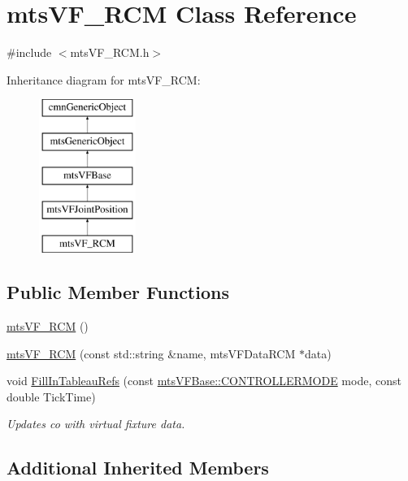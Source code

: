 \hypertarget{classmts_v_f___r_c_m}{\section{mts\-V\-F\-\_\-\-R\-C\-M Class Reference}
\label{classmts_v_f___r_c_m}
}


{\ttfamily \#include $<$mts\-V\-F\-\_\-\-R\-C\-M.\-h$>$}

Inheritance diagram for mts\-V\-F\-\_\-\-R\-C\-M\-:\begin{figure}[H]
\begin{center}
\leavevmode
\includegraphics[height=5.000000cm]{d1/d4d/classmts_v_f___r_c_m}
\end{center}
\end{figure}
\subsection*{Public Member Functions}
\begin{DoxyCompactItemize}
\item 
\hyperlink{classmts_v_f___r_c_m_a498694d6f40a885fdeff78fa3abc6928}{mts\-V\-F\-\_\-\-R\-C\-M} ()
\item 
\hyperlink{classmts_v_f___r_c_m_af9e9ec6c89ec0cab34e23a5993a4f74c}{mts\-V\-F\-\_\-\-R\-C\-M} (const std\-::string \&name, mts\-V\-F\-Data\-R\-C\-M $\ast$data)
\item 
void \hyperlink{classmts_v_f___r_c_m_ad73095feb636989427c3f3e8d200b3a9}{Fill\-In\-Tableau\-Refs} (const \hyperlink{classmts_v_f_base_a742dd08f8b70bafeb746cec14d9ee974}{mts\-V\-F\-Base\-::\-C\-O\-N\-T\-R\-O\-L\-L\-E\-R\-M\-O\-D\-E} mode, const double Tick\-Time)
\begin{DoxyCompactList}\small\item\em Updates co with virtual fixture data. \end{DoxyCompactList}\end{DoxyCompactItemize}
\subsection*{Additional Inherited Members}


